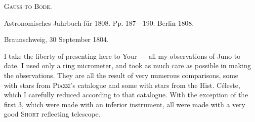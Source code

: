\centerline{\textsc{Gauss to Bode.}}

\medskip
Astronomisches Jahrbuch für 1808. Pp. 187---190. Berlin 1808.

\medskip
\begin{flushright}
Braunschweig, 30 September 1804.
\end{flushright}

I take the liberty of presenting here to Your --- all my observations of Juno to date. I used only a ring micrometer, and took as much care as possible in making the observations. They are all the result of very numerous comparisons, some with stars from \textsc{Piazzi}’s catalogue and some with stars from the Hist. Céleste, which I carefully reduced according to that catalogue. With the exception of the first 3, which were made with an inferior instrument, all were made with a very good \textsc{Short} reflecting telescope.

